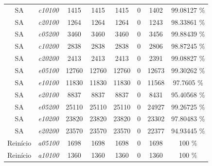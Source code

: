 \documentclass[portugues, brazil, a4paper,12pt]{article}
\begin{document}
{\begin{longtable}{cc|cccc|cc}
			SA                 & \textit{c10100}  & 1415      & 1415           & 1415         & 0                      &  1402                           & 99.08127 \% \\
			SA                 & \textit{c20100}  & 1264      & 1264           & 1264         & 0                      &  1243                           & 98.33861 \% \\
			SA                 & \textit{c05200}  & 3460      & 3460           & 3460         & 0                      &  3456                           & 99.88439 \% \\
			SA                 & \textit{c10200}  & 2838      & 2838           & 2838         & 0                      &  2806                           & 98.87245 \% \\
			SA                 & \textit{c20200}  & 2413      & 2413           & 2413         & 0                      &  2391                           & 99.08827 \% \\
			SA                 & \textit{e05100}  & 12760     & 12760          & 12760        & 0                      &   12673                         & 99.30262 \% \\
			SA                 & \textit{e10100}  & 11830     & 11830          & 11830        & 0                      &   11568                         & 97.7605 \% \\
			SA                 & \textit{e20100}  & 8837      & 8837           & 8837         & 0                      &   8431                          & 95.40568 \% \\
			SA                 & \textit{e05200}  & 25110     & 25110          & 25110        & 0                      &   24927                         & 99.26725 \% \\
			SA                 & \textit{e10200}  & 23820     & 23820          & 23820        & 0                      &   23302                         & 97.80483 \% \\
			SA                 & \textit{e20200}  & 23570     & 23570          & 23570        & 0                      &   22377                         & 94.93445 \% \\ \hline
			Reinício           & \textit{a05100}  & 1698      & 1698           & 1698         & 0                      & 1698                            & 100 \% \\
			Reinício           & \textit{a10100}  & 1360      & 1360           & 1360         & 0                      & 1360                            & 100 \% \\

\end{longtable}}
\end{document}
